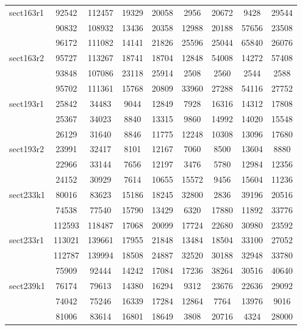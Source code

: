 \documentclass[a4paper]{article}
\begin{document}
\begin{center}
\begin{longtable}{ |l|c|c|c|c|c|c|c|c| }
sect163r1 & 92542 & 112457 & 19329 & 20058 & 2956 & 20672 & 9428 & 29544 \\
& 90832 & 108932 & 13436 & 20358 & 12988 & 20188 & 57656 & 23508 \\
& 96172 & 111082 & 14141 & 21826 & 25596 & 25044 & 65840 & 26076 \\ \hline

sect163r2 & 95727 & 113267 & 18741 & 18704 & 12848 & 54008 & 14272 & 57408 \\
& 93848 & 107086 & 23118 & 25914 & 2508 & 2560 & 2544 & 2588 \\
& 95702 & 111361 & 15768 & 20809 & 33960 & 27288 & 54116 & 27752 \\ \hline

sect193r1 & 25842 & 34483 & 9044 & 12849 & 7928 & 16316 & 14312 & 17808 \\
& 25367 & 34023 & 8840 & 13315 & 9860 & 14992 & 14020 & 15548 \\ 
& 26129 & 31640 & 8846 & 11775 & 12248 & 10308 & 13096 & 17680 \\ \hline

sect193r2 & 23991 & 32417 & 8101 & 12167 & 7060 & 8500 & 13604 & 8880 \\
& 22966 & 33144 & 7656 & 12197 & 3476 & 5780 & 12984 & 12356 \\ 
& 24152 & 30929 & 7614 & 10655 & 15572 & 9456 & 15604 & 11236 \\ \hline

sect233k1 & 80016 & 83623 & 15186 & 18245 & 32800 & 2836 & 39196 & 20516 \\
& 74538 & 77540 & 15790 & 13429 & 6320 & 17880 & 11892 & 33776 \\ 
& 112593 & 118487 & 17068 & 20099 & 17724 & 22680 & 30980 & 23592 \\ \hline

sect233r1 & 113021 & 139661 & 17955 & 21848 & 13484 & 18504 & 33100 & 27052 \\
& 112787 & 139994 & 18508 & 24887 & 32520 & 30188 & 32948 & 33780 \\
& 75909 & 92444 & 14242 & 17084 & 17236 & 38264 & 30516 & 40640 \\ \hline

sect239k1 & 76174 & 79613 & 14380 & 16294 & 9312 & 23676 & 22636 & 29092 \\
& 74042 & 75246 & 16339 & 17284 & 12864 & 7764 & 13976 & 9016 \\ 
& 81006 & 83614 & 16801 & 18649 & 3808 & 20716 & 4324 & 28000 \\ \hline


\end{longtable}
\end{center}
\end{document}
